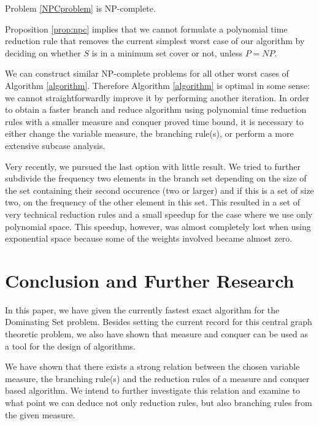 \documentclass[fleqn]{stacs_proc}
\begin{document}
\begin{proposition} \label{prop:npc}
Problem \ref{NPCproblem} is NP-complete.
\end{proposition}

Proposition \ref{prop:npc} implies that we cannot formulate a polynomial time reduction rule that removes the
current simplest worst case of our algorithm by deciding on whether $S$ is in a minimum set cover or not, unless $P=NP$.

We can construct similar NP-complete problems for all other worst cases of Algorithm \ref{algorithm}.
Therefore Algorithm \ref{algorithm} is optimal in some sense:
we cannot straightforwardly improve it by performing another iteration.
In order to obtain a faster branch and reduce algorithm using polynomial time reduction rules 
with a smaller measure and conquer proved time bound,
it is necessary to either change the variable measure, the branching rule(s),
or perform a more extensive subcase analysis.

Very recently, we pursued the last option with little result.
We tried to further subdivide the frequency two elements in the branch set
depending on the size of the set containing their second occurence (two or larger) and
if this is a set of size two, on the frequency of the other element in this set.
This resulted in a set of very technical reduction rules
and a small speedup for the case where we use only polynomial space.
This speedup, however, was almost completely lost when using exponential space
because some of the weights involved became almost zero.







\section{Conclusion and Further Research}
In this paper, we have given the currently fastest exact algorithm for the {\sc Dominating Set}
problem. Besides setting the current record for this central graph theoretic problem, we also
have shown that measure and conquer can be used as a tool for the design of algorithms.

We have shown that there exists a strong relation between the chosen variable measure,
the branching rule(s) and the reduction rules of a measure and conquer based algorithm.
We intend to further investigate this relation and 
examine to what point we can deduce not only reduction rules,
but also branching rules from the given measure.
\end{document}
